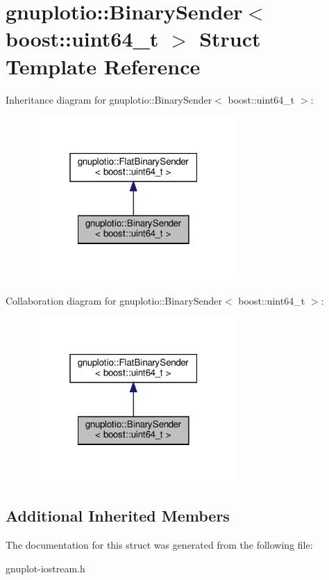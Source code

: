 \hypertarget{structgnuplotio_1_1BinarySender_3_01boost_1_1uint64__t_01_4}{}\section{gnuplotio\+:\+:Binary\+Sender$<$ boost\+:\+:uint64\+\_\+t $>$ Struct Template Reference}
\label{structgnuplotio_1_1BinarySender_3_01boost_1_1uint64__t_01_4}


Inheritance diagram for gnuplotio\+:\+:Binary\+Sender$<$ boost\+:\+:uint64\+\_\+t $>$\+:
\nopagebreak
\begin{figure}[H]
\begin{center}
\leavevmode
\includegraphics[width=217pt]{structgnuplotio_1_1BinarySender_3_01boost_1_1uint64__t_01_4__inherit__graph}
\end{center}
\end{figure}


Collaboration diagram for gnuplotio\+:\+:Binary\+Sender$<$ boost\+:\+:uint64\+\_\+t $>$\+:
\nopagebreak
\begin{figure}[H]
\begin{center}
\leavevmode
\includegraphics[width=217pt]{structgnuplotio_1_1BinarySender_3_01boost_1_1uint64__t_01_4__coll__graph}
\end{center}
\end{figure}
\subsection*{Additional Inherited Members}


The documentation for this struct was generated from the following file\+:\begin{DoxyCompactItemize}
\item 
gnuplot-\/iostream.\+h\end{DoxyCompactItemize}
